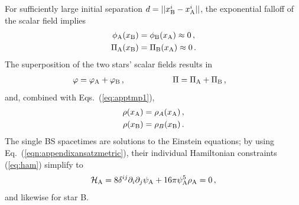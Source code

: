 \documentclass[]{iopart}
\begin{document}
For sufficiently large initial separation $d=||x_{\rm B}^i
-x_{\rm A}^i||$, the exponential falloff of the scalar field
implies
\begin{equation}
\begin{aligned}
    \phi_{\rm A}(x_{\rm B}) &= \phi_{\rm B}(x_{\rm A}) \approx 0\,, \\
     \Pi_{\rm A}(x_{\rm B}) &= \Pi_{\rm B}(x_{\rm A}) \approx 0\,.
\end{aligned}
\label{eq:apptmp1}
\end{equation}
The superposition of the two stars' scalar fields results in
%
\begin{align}
  &\varphi = \varphi_{\rm A} + \varphi_{\rm B}\,,
  \hspace{0.85cm}~~~~~~~~~~
  \Pi = \Pi_{\rm A} + \Pi_{\rm B}\,,
\end{align}
%
and, combined with Eqs.~(\ref{eq:apptmp1}),
\begin{equation}
\begin{aligned}
  \rho(x_{\rm A}) &= \rho_A(x_{\rm A})\,, \\
  \rho(x_{\rm B}) &= \rho_B(x_{\rm B})\,.
\end{aligned}\label{eqn:energydensityconditon}
\end{equation}
The single BS spacetimes are solutions to the Einstein equations;
by using Eq.~(\ref{eqn:appendixansatzmetric}), their individual
Hamiltonian constraints (\ref{eq:ham}) simplify to
%
\begin{equation}
    \mathcal{H}_{\rm A} = 8 \delta^{ij} \partial_i\partial_j  \psi_{\rm A} +  16\pi \psi_{\rm A}^5\rho_{\rm A} = 0\,,
    \label{eq:hamA}
\end{equation}
%
and likewise for star B.
\end{document}
